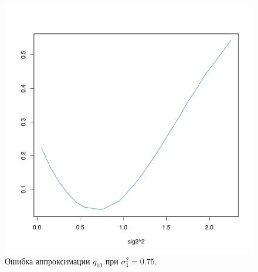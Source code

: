 \documentclass[specialist, substylefile = spbu.rtx,
subf,href,colorlinks=true, 12pt]{disser}
\begin{document}
\begin{figure}[!hhh]
	\begin{center}
		\begin{minipage}[h]{0.8\linewidth}
			\includegraphics[width=1\linewidth]{img/gr_neww_2.pdf}
			\caption{Ошибка аппроксимации $q_{10}$ при $\sigma_{1}^{2} = 0.75$.} %
			\label{ris4_2} %
		\end{minipage}	
	\end{center}
\end{figure}
\end{document}

